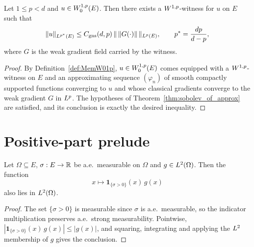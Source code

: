 \begin{corollary}
\label{cor:sobolev_W01p}
\leanok
{}
Let $1 \le p < d$ and $u \in W_0^{1,p}(E)$. Then there exists a
$W^{1,p}$-witness for $u$ on $E$ such that
\begin{equation*}
  \|u\|_{L^{p^*}(E)} \le C_{\mathrm{gns}}(d,p)\,\|\,\|G(\cdot)\|\,\|_{L^{p}(E)},
  \qquad p^* = \frac{dp}{d - p},
\end{equation*}
where $G$ is the weak gradient field carried by the witness.
\end{corollary}

\begin{proof}
\leanok
{}

By Definition~\ref{def:MemW01p}, $u \in W_0^{1,p}(E)$ comes equipped with a
$W^{1,p}$-witness on $E$ and an approximating sequence $(\varphi_n)$ of
smooth compactly supported functions converging to $u$ and whose classical
gradients converge to the weak gradient $G$ in $L^{p}$. The hypotheses of
Theorem~\ref{thm:sobolev_of_approx} are satisfied, and its conclusion is
exactly the desired inequality.
\end{proof}

\section{Positive-part prelude}

\begin{lemma}
\label{lem:indicator_component_memLp}
\leanok
Let $\Omega \subseteq E$, $\sigma : E \to \mathbb{R}$ be a.e.\ measurable on $\Omega$
and $g \in L^{2}(\Omega)$. Then the function
\begin{equation*}
  x \mapsto \mathbf{1}_{\{\sigma > 0\}}(x)\,g(x)
\end{equation*}
also lies in $L^{2}(\Omega)$.
\end{lemma}

\begin{proof}
\leanok

The set $\{\sigma > 0\}$ is measurable since $\sigma$ is a.e.\ measurable, so
the indicator multiplication preserves a.e.\ strong measurability. Pointwise,
$|\mathbf{1}_{\{\sigma > 0\}}(x)\,g(x)| \le |g(x)|$, and squaring, integrating
and applying the $L^{2}$ membership of $g$ gives the conclusion.
\end{proof}

